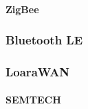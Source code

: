 \paragraph{ZigBee} 


\subsubsection{Bluetooth LE}


\subsubsection{LoaraWAN}

\paragraph{SEMTECH}


